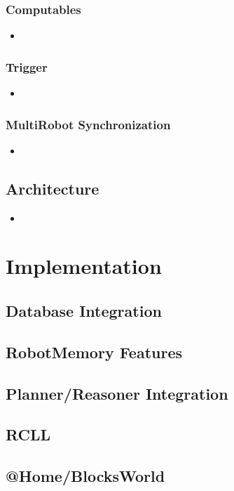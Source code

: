 \documentclass[a4paper,11pt]{article}
\begin{document}
\subsubsection{Computables}
\begin{itemize}
\item 
\end{itemize}
\subsubsection{Trigger}
\begin{itemize}
\item 
\end{itemize}
\subsubsection{MultiRobot Synchronization}
\begin{itemize}
\item 
\end{itemize}
\subsection{Architecture}
\begin{itemize}
\item 
\end{itemize}


\section{Implementation}
\subsection{Database Integration}
\subsection{RobotMemory Features}
\subsection{Planner/Reasoner Integration}
\subsection{RCLL}
\subsection{@Home/BlocksWorld}
\end{document}
